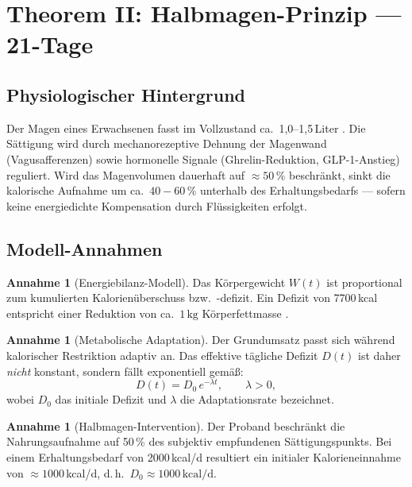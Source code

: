 ﻿\documentclass[12pt,a4paper]{article}
\theoremstyle{plain}
\theoremstyle{definition}
\newtheorem{assumption}[theorem]{Annahme}
\theoremstyle{remark}
\begin{document}
\section{Theorem II: Halbmagen-Prinzip --- 21-Tage}
\label{sec:diet}

\subsection{Physiologischer Hintergrund}

Der Magen eines Erwachsenen fasst im Vollzustand ca.\ 1{,}0--1{,}5\,Liter
\cite{Tortora2014}. Die Sättigung wird durch mechanorezeptive Dehnung der
Magenwand (Vagusafferenzen) sowie hormonelle Signale (Ghrelin-Reduktion,
GLP-1-Anstieg) reguliert. Wird das Magenvolumen dauerhaft auf $\approx 50\,\%$
beschränkt, sinkt die kalorische Aufnahme um ca.\ $40-60\,\%$ unterhalb des
Erhaltungsbedarfs --- sofern keine energiedichte Kompensation durch Flüssigkeiten
erfolgt.

\subsection{Modell-Annahmen}

\begin{assumption}[Energiebilanz-Modell]
\label{ass:energy}
Das Körpergewicht $W(t)$ ist proportional zum kumulierten Kalorienüberschuss
bzw.\ -defizit. Ein Defizit von 7700\,kcal entspricht einer Reduktion von
ca.\ $1\,\text{kg}$ Körperfettmasse \cite{Hall2012}.
\end{assumption}

\begin{assumption}[Metabolische Adaptation]
\label{ass:metab}
Der Grundumsatz passt sich während kalorischer Restriktion adaptiv an. Das
effektive tägliche Defizit $D(t)$ ist daher \emph{nicht} konstant, sondern
fällt exponentiell gemäß:
\begin{equation}
  D(t) = D_0 \, e^{-\lambda t}, \qquad \lambda > 0,
  \label{eq:deficit}
\end{equation}
wobei $D_0$ das initiale Defizit und $\lambda$ die Adaptationsrate bezeichnet.
\end{assumption}

\begin{assumption}[Halbmagen-Intervention]
\label{ass:half}
Der Proband beschränkt die Nahrungsaufnahme auf 50\,\% des subjektiv
empfundenen Sättigungspunkts. Bei einem Erhaltungsbedarf von 2000\,kcal/d
resultiert ein initialer Kalorieneinnahme von $\approx 1000$\,kcal/d,
d.\,h.\ $D_0 \approx 1000\,\text{kcal/d}$.
\end{assumption}
\end{document}
